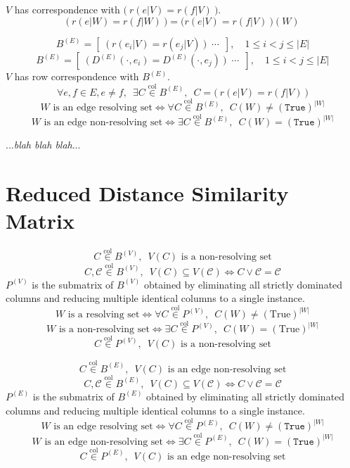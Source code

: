 \documentclass{article}
\begin{document}
	\vspace{2em}

	\(V\) has correspondence with \(\bm{(}\ r(e|V) = r(f|V)\ \bm{)}\).
	\[ \bm{(}\ r(e|W) = r(f|W)\ \bm{)} = \bm{(} r(e|V) = r(f|V)\ \bm{)}(W) \]

	\[ B^{(E)} = \left[\enspace \bm{(}\ r(e_i|V) = r(e_j|V)\ \bm{)}\enspace \cdots\enspace \right],\quad 1 \leq i < j \leq |E| \]
	\[ B^{(E)} = \left[\enspace \bm{(}\ D^{(E)}(\cdot, e_i) = D^{(E)}(\cdot, e_j)\ \bm{)} \enspace \cdots\enspace \right],\quad 1 \leq i < j \leq |E| \]
	\(V\) has row correspondence with \(B^{(E)}\).
	\[ \forall e, f \in E, e \neq f,\enspace \exists C \overset{\mathrm{col}}{\in} B^{(E)},\enspace C = \bm{(}\ r(e|V) = r(f|V)\ \bm{)} \]
	\[ W \text{ is an edge resolving set} \iff \forall C \overset{\mathrm{col}}{\in} B^{(E)},\enspace C(W) \neq (\mathtt{True})^{|W|} \]
	\[ W \text{ is an edge non-resolving set} \iff \exists C \overset{\mathrm{col}}{\in} B^{(E)},\enspace C(W) = (\mathtt{True})^{|W|} \]

	...\textit{blah blah blah}...

	\clearpage
	\section{Reduced Distance Similarity Matrix}

	\[ C \overset{\mathrm{col}}{\in} B^{(V)},\enspace V(C) \text{ is a non-resolving set} \]
	\[ C, \mathcal{C} \overset{\mathrm{col}}{\in} B^{(V)},\enspace V(C) \subseteq V(\mathcal{C}) \iff C \vee \mathcal{C} = \mathcal{C} \]
	\(P^{(V)}\) is the submatrix of \(B^{(V)}\) obtained by eliminating all strictly dominated columns and reducing multiple identical columns to a single instance.
	\[ W \text{ is a resolving set} \iff \forall C \overset{\mathrm{col}}{\in} P^{(V)},\enspace C(W) \neq (\mathrm{True})^{|W|} \]
	\[ W \text{ is a non-resolving set} \iff \exists C \overset{\mathrm{col}}{\in} P^{(V)},\enspace C(W) = (\mathrm{True})^{|W|} \]
	\[ C \overset{\mathrm{col}}{\in} P^{(V)},\enspace V(C) \text{ is a non-resolving set} \]

	\[ C \overset{\mathrm{col}}{\in} B^{(E)},\enspace V(C) \text{ is an edge non-resolving set} \]
	\[ C, \mathcal{C} \overset{\mathrm{col}}{\in} B^{(E)},\enspace V(C) \subseteq V(\mathcal{C}) \iff C \vee \mathcal{C} = \mathcal{C} \]
	\(P^{(E)}\) is the submatrix of \(B^{(E)}\) obtained by eliminating all strictly dominated columns and reducing multiple identical columns to a single instance.
	\[ W \text{ is an edge resolving set} \iff \forall C \overset{\mathrm{col}}{\in} P^{(E)},\enspace C(W) \neq (\mathtt{True})^{|W|} \]
	\[ W \text{ is an edge non-resolving set} \iff \exists C \overset{\mathrm{col}}{\in} P^{(E)},\enspace C(W) = (\mathtt{True})^{|W|} \]
	\[ C \overset{\mathrm{col}}{\in} P^{(E)},\enspace V(C) \text{ is an edge non-resolving set} \]
\end{document}
